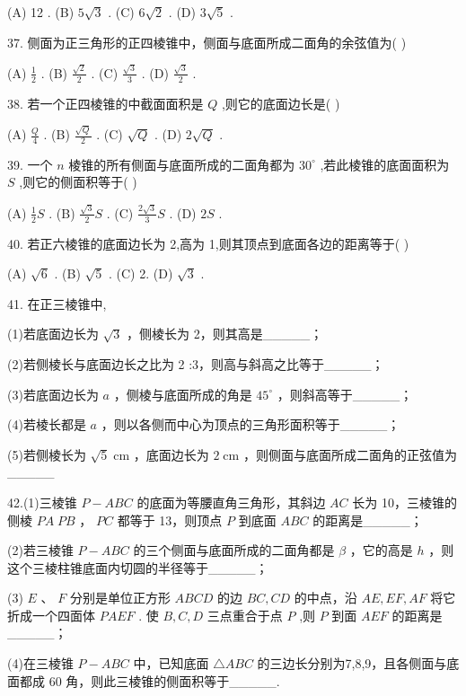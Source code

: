 \documentclass[10pt]{article}
\begin{document}
(A) 12 . (B) \(5\sqrt{3}\) . (C) \(6\sqrt{2}\) . (D) \(3\sqrt{5}\) .

37. 侧面为正三角形的正四棱锥中，侧面与底面所成二面角的余弦值为( )

(A) \(\frac{1}{2}\) . (B) \(\frac{\sqrt{2}}{2}\) . (C) \(\frac{\sqrt{3}}{3}\) . (D) \(\frac{\sqrt{3}}{2}\) .

38. 若一个正四棱锥的中截面面积是 \(Q\) ,则它的底面边长是( )

(A) \(\frac{Q}{4}\) . (B) \(\frac{\sqrt{Q}}{2}\) . (C) \(\sqrt{Q}\) . (D) \(2\sqrt{Q}\) .

39. 一个 \(n\) 棱锥的所有侧面与底面所成的二面角都为 \({30}^{ \circ  }\) ,若此棱锥的底面面积为 \(S\) ,则它的侧面积等于( )

(A) \(\frac{1}{2}S\) . (B) \(\frac{\sqrt{3}}{2}S\) . (C) \(\frac{2\sqrt{3}}{3}S\) . (D) \({2S}\) .

40. 若正六棱锥的底面边长为 2,高为 1,则其顶点到底面各边的距离等于( )

(A) \(\sqrt{6}\) . (B) \(\sqrt{5}\) . (C) 2. (D) \(\sqrt{3}\) .

41. 在正三棱锥中,

(1)若底面边长为 \(\sqrt{3}\) ，侧棱长为 2，则其高是\_\_\_\_\_；

(2)若侧棱长与底面边长之比为 2 :3，则高与斜高之比等于\_\_\_\_\_；

(3)若底面边长为 \(a\) ，侧棱与底面所成的角是 \({45}^{ \circ  }\) ，则斜高等于\_\_\_\_\_；

(4)若棱长都是 \(a\) ，则以各侧而中心为顶点的三角形面积等于\_\_\_\_\_；

(5)若侧棱长为 \(\sqrt{5}\mathrm{\;{cm}}\) ，底面边长为 \(2\mathrm{\;{cm}}\) ，则侧面与底面所成二面角的正弦值为\_\_\_\_\_

42.(1)三棱锥 \(P - {ABC}\) 的底面为等腰直角三角形，其斜边 \({AC}\) 长为 10，三棱锥的侧棱 \({PA} \; {PB}\) ， \({PC}\) 都等于 13，则顶点 \(P\) 到底面 \({ABC}\) 的距离是\_\_\_\_\_；

(2)若三棱锥 \(P - {ABC}\) 的三个侧面与底面所成的二面角都是 \(\beta\) ，它的高是 \(h\) ，则这个三棱柱锥底面内切圆的半径等于\_\_\_\_\_；

(3) \(E\text{ 、 }F\) 分别是单位正方形 \({ABCD}\) 的边 \({BC},{CD}\) 的中点，沿 \({AE},{EF},{AF}\) 将它折成一个四面体 \({PAEF}\) . 使 \(B,C,D\) 三点重合于点 \(P\) ,则 \(P\) 到面 \({AEF}\) 的距离是\_\_\_\_\_；

(4)在三棱锥 \(P - {ABC}\) 中，已知底面 \(\bigtriangleup  {ABC}\) 的三边长分别为7,8,9，且各侧面与底面都成 60 \textdegree 角，则此三棱锥的侧面积等于\_\_\_\_\_.
\end{document}
